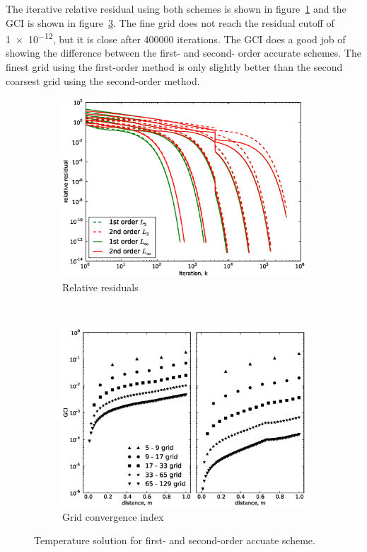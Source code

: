 \documentclass[11pt, letterpaper]{article}
\newcommand{\fig}[1]{figure~\ref{#1}}
\begin{document}
The iterative relative residual using both schemes is shown in \fig{fig:p2_relresid}
and the GCI is shown in \fig{fig:p2_gci}.  The fine grid does not reach the 
residual cutoff of \num{1e-12}, but it is close after \num{400000} iterations.
The GCI does a good job of showing the difference between the first- and second- order
accurate schemes.  The finest grid using the first-order method is only slightly
better than the second coarsest grid using the second-order method.

\begin{figure}
	\centering
	\begin{subfigure}[b]{0.475\textwidth}
		\centering
		\includegraphics[width=\textwidth]{./figs/p2-relresid.eps}
		\caption{Relative residuals}
		\label{fig:p2_relresid}
	\end{subfigure}
	~
	\begin{subfigure}[b]{0.475\textwidth}
		\centering
		\includegraphics[width=\textwidth]{./figs/p2_gci.eps}
		\caption{Grid convergence index}
		\label{fig:p2_gci}
	\end{subfigure}
	\caption{Temperature solution for first- and second-order accuate scheme.}
\end{figure}
\end{document}
